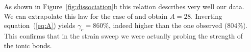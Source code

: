 \documentclass[journal=jacsat,manuscript=article]{achemso}
\begin{document}
As shown in Figure~\ref{fig:dissociation}b this relation describes very well our data. We can extrapolate this law for the case of  and obtain $A = 28$. Inverting equation~(\ref{eq:A}) yields $\gamma_c = 860\%$, indeed higher than the one observed (804\%). This confirms that in the  strain sweep we were actually probing the strength of the ionic bonds.

\end{document}
